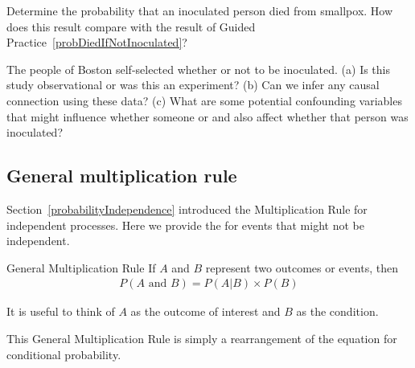 \begin{exercisewrap}
\begin{nexercise}
Determine the probability that an inoculated person died from smallpox. How does this result compare with the result of Guided Practice~\ref{probDiedIfNotInoculated}?\footnotemark
\end{nexercise}
\end{exercisewrap}

\begin{exercisewrap}
\begin{nexercise}\label{SmallpoxInoculationObsExpExercise}
The people of Boston self-selected whether or not to be inoculated. (a) Is this study observational or was this an experiment? (b) Can we infer any causal connection using these data? (c) What are some potential confounding variables that might influence whether someone  or  and also affect whether that person was inoculated?\footnotemark
\end{nexercise}
\end{exercisewrap}


\subsection{General multiplication rule}

Section~\ref{probabilityIndependence} introduced the Multiplication Rule for independent processes. Here we provide the  for events that might not be independent.

\begin{onebox}{General Multiplication Rule}
If $A$ and $B$ represent two outcomes or events, then \vspace{-1.5mm}
\begin{align*}
P(A\text{ and }B) = P(A | B)\times P(B)
\end{align*} \vspace{-6.5mm} \par
It is useful to think of $A$ as the outcome of interest and $B$ as the condition.
\end{onebox}
This General Multiplication Rule is simply a rearrangement of the equation for conditional probability.

